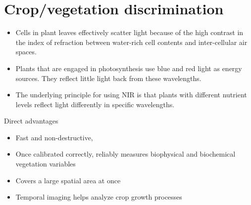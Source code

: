 \documentclass[11pt,dvipsnames,ignorenonframetext,aspectratio=169]{beamer}
\providecommand{\tightlist}{%
  \setlength{\itemsep}{0pt}\setlength{\parskip}{0pt}}
\begin{document}
\hypertarget{cropvegetation-discrimination}{%
\section{Crop/vegetation
discrimination}\label{cropvegetation-discrimination}}

\begin{frame}{}
\protect\hypertarget{section-3}{}
\begin{itemize}
\tightlist
\item
  Cells in plant leaves effectively scatter light because of the high
  contrast in the index of refraction between water-rich cell contents
  and inter-cellular air spaces.
\item
  Plants that are engaged in photosynthesis use blue and red light as
  energy sources. They reflect little light back from these wavelengths.
\item
  The underlying principle for using NIR is that plants with different
  nutrient levels reflect light differently in specific wavelengths.
\end{itemize}
\end{frame}

\begin{frame}{Direct advantages}
\protect\hypertarget{direct-advantages}{}
\begin{itemize}
\tightlist
\item
  Fast and non-destructive,
\item
  Once calibrated correctly, reliably measures biophysical and
  biochemical vegetation variables
\item
  Covers a large spatial area at once
\item
  Temporal imaging helps analyze crop growth processes
\end{itemize}
\end{frame}
\end{document}
